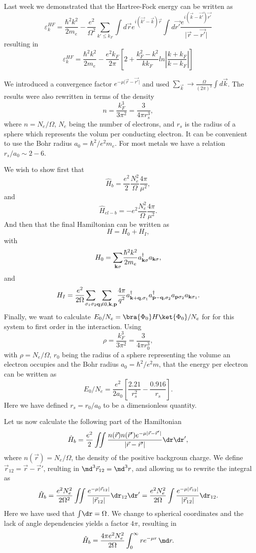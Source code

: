 Last week we demonstrated that the Hartree-Fock energy can be written as 
\[
\varepsilon_{k}^{HF}=\frac{\hbar^{2}k^{2}}{2m_e}-\frac{e^{2}}
{\Omega^{2}}\sum_{k'\leq
k_{F}}\int d\vec{r}e^{i(\vec{k'}-\vec{k})\vec{r}}\int
d\vec{r'}\frac{e^{i(\vec{k}-\vec{k'})\vec{r'}}}
{\vert\vec{r}-\vec{r'}\vert}
\]
resulting in
\[
\varepsilon_{k}^{HF}=\frac{\hbar^{2}k^{2}}{2m_e}-\frac{e^{2}
k_{F}}{2\pi}
\left[
2+\frac{k_{F}^{2}-k^{2}}{kk_{F}}ln\left\vert\frac{k+k_{F}}
{k-k_{F}}\right\vert
\right]
\]

We introduced a convergence factor $e^{-\mu\vert\vec{r}-\vec{r'}\vert}$ and used
$\sum_{\vec{k}}\rightarrow
\frac{\Omega}{(2\pi)^{3}}\int d\vec{k}$. The results were also rewritten in terms of the density
\[
n= \frac{k_F^3}{3\pi^2}=\frac{3}{4\pi r_s^3},
\]
where $n=N_e/\Omega$, $N_e$ being the number of electrons, and $r_s$ is the radius of a sphere which represents the volum per conducting electron.  
It can be convenient to use the Bohr radius $a_0=\hbar^2/e^2m_e$.
For most metals we have a relation $r_s/a_0\sim 2-6$.

We wish to show first  that
\[
\hat{H}_{b}=\frac{e^2}{2}\frac{N_e^2}{\Omega}\frac{4\pi}{\mu^2},
\]
and
\[
\hat{H}_{el-b}=-e^2\frac{N_e^2}{\Omega}\frac{4\pi}{\mu^2}.
\]
And then that the final Hamiltonian can be written as 
\[
H=H_{0}+H_{I},
\]
with
\[
H_{0}={\displaystyle\sum_{{\bf k}\sigma}}
\frac{\hbar^{2}k^{2}}{2m_e}a_{{\bf k}\sigma}^{\dagger}
a_{{\bf k}\sigma},
\]
and
\[
H_{I}=\frac{e^{2}}{2\Omega}{\displaystyle\sum_{\sigma_{1}
\sigma_{2}}}{\displaystyle
\sum_{{\bf q}\neq 0,{\bf k},{\bf p}}}\frac{4\pi}{q^{2}}
a_{{\bf k}+{\bf q},\sigma_{1}}^{\dagger}
a_{{\bf p}-{\bf q},\sigma_{2}}^{\dagger}
a_{{\bf p}\sigma_{2}}a_{{\bf k}\sigma_{1}}.
\] 
Finally, we want to
calculate
$E_0/N_e=\bra{\Phi_{0}}H\ket{\Phi_{0}}/N_e$ for
for this system to first order in the interaction.  
Using
\[
\rho= \frac{k_F^3}{3\pi^2}=\frac{3}{4\pi r_0^3},
\]
with $\rho=N_e/\Omega$, $r_0$
being the radius of a sphere representing the volume an electron occupies 
and the Bohr radius $a_0=\hbar^2/e^2m$, 
that the energy per electron can be written as 
\[
E_0/N_e=\frac{e^2}{2a_0}\left[\frac{2.21}{r_s^2}-\frac{0.916}{r_s}\right].
\]
Here we have defined
$r_s=r_0/a_0$ to be a dimensionless quantity.

Let us now calculate the following part of the Hamiltonian
\[ \hat H_b = \frac{e^2}{2} \iint \frac{n(\vec r) n(\vec r')e^{-\mu|\vec r - \vec r'|}}{|\vec r - \vec r'|} \dr \dr' , \]
%
where $n(\vec r) = N_e/\Omega$, the density of the positive backgroun charge. We define $\vec r_{12} = \vec r - \vec r'$, reulting in $\md^3 \vec r_{12} = \md^3 r$, and allowing us to rewrite the integral as
\[ \hat H_b = \frac{e^2 N_e^2}{2\Omega^2} \iint \frac{e^{-\mu |\vec r_{12}|}}{|\vec r_{12}|} \dr_{12} \dr' = \frac{e^2 N_e^2}{2\Omega} \int \frac{e^{-\mu |\vec r_{12}|}}{|\vec r_{12}|} \dr_{12} . \]
%
Here we have used that $\int \! \dr = \Omega$. We change to spherical coordinates and the lack of angle 
dependencies yields a factor $4\pi$, resulting in
\[ \hat H_b = \frac{4\pi e^2 N_e^2}{2\Omega} \int_0^\infty re^{-\mu r} \, \md r . \]

